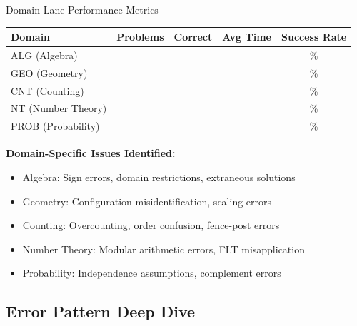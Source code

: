 \documentclass{article}
\begin{document}
\begin{analysisbox}{Domain Lane Performance Metrics}
\begin{center}
\begin{tabular}{|l|c|c|c|c|}
\hline
\textbf{Domain} & \textbf{Problems} & \textbf{Correct} & \textbf{Avg Time} & \textbf{Success Rate} \\
\hline
ALG (Algebra) & & & & \% \\
GEO (Geometry) & & & & \% \\
CNT (Counting) & & & & \% \\
NT (Number Theory) & & & & \% \\
PROB (Probability) & & & & \% \\
\hline
\end{tabular}
\end{center}

\textbf{Domain-Specific Issues Identified:}
\begin{itemize}[nosep]
\item[$\square$] Algebra: Sign errors, domain restrictions, extraneous solutions
\item[$\square$] Geometry: Configuration misidentification, scaling errors
\item[$\square$] Counting: Overcounting, order confusion, fence-post errors
\item[$\square$] Number Theory: Modular arithmetic errors, FLT misapplication
\item[$\square$] Probability: Independence assumptions, complement errors
\end{itemize}
\end{analysisbox}

\subsection{Error Pattern Deep Dive}
\end{document}
